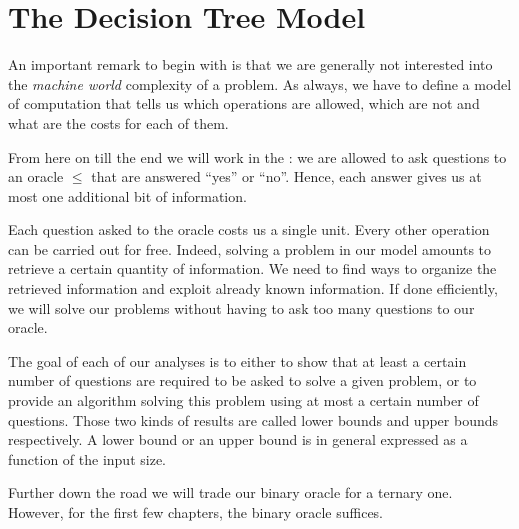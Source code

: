 \section{The Decision Tree Model}
\label{tree:sorting:model}

An important remark to begin with is that we are generally not interested
into the \emph{machine world} complexity of a problem. As always, we have to
define a model of computation that tells us which operations are allowed, which
are not and what are the costs for each of them.

From here on till the end we will work in the :
we are allowed to ask questions to an oracle \(\le\) that are answered
``yes'' or ``no''. Hence, each answer gives us at most
one additional bit of information.

Each question asked to the oracle costs us a single unit.
Every other operation can be carried out for free. Indeed, solving a problem in
our model amounts to retrieve a certain quantity of information. We
need to find ways to organize the retrieved information and exploit already
known information. If done efficiently, we will solve our problems without
having to ask too many questions to our oracle.

The goal of each of our analyses is to either to show that at least a certain
number of questions are required to be asked to solve a given problem, or to
provide an algorithm solving this problem using at most a certain number of
questions. Those two kinds of results are called lower bounds and upper bounds
respectively. A lower bound or an upper bound is in general expressed as
a function of the input size.

Further down the road we will trade our binary oracle for a ternary one.
However, for the first few chapters, the binary oracle suffices.

